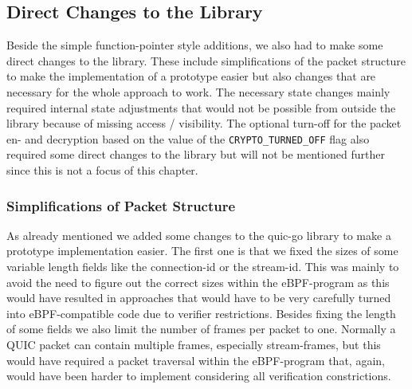 \subsection{Direct Changes to the Library}

Beside the simple function-pointer style additions, we also had to make some direct changes to the library.
These include simplifications of the packet structure to make the implementation of a prototype easier 
but also changes that are necessary for the whole approach to work.
The necessary state changes mainly required internal state adjustments that would not be possible from outside 
the library because of missing access / visibility.
The optional turn-off for the packet en- and decryption based on the value of the \verb|CRYPTO_TURNED_OFF| flag
also required some direct changes to the library but will not be mentioned further since this is not a 
focus of this chapter.

\subsubsection*{Simplifications of Packet Structure}
As already mentioned we added some changes to the quic-go library to make a prototype implementation easier.
The first one is that we fixed the sizes of some variable length fields like the connection-id or the stream-id.
This was mainly to avoid the need to figure out the correct sizes within the eBPF-program as this would have 
resulted in approaches that would have to be very carefully turned into eBPF-compatible code due to verifier
restrictions.
Besides fixing the length of some fields we also limit the number of frames per packet to one.
Normally a QUIC packet can contain multiple frames, especially stream-frames, but this would have required 
a packet traversal within the eBPF-program that, again, would have been harder to implement considering all
verification constrictions.

